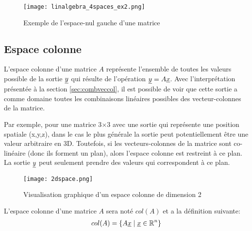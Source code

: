 \begin{example}
\begin{figure}[H]
	\centering
		\texttt{[image: linalgebra\_4spaces\_ex2.png]}
	\caption{Exemple de l'espace-nul gauche d'une matrice}
	\label{fig:4spaces_ex2}
\end{figure}
\end{example}

\subsection{Espace colonne}
\label{sec:espcol}

L'espace colonne d'une matrice $A$ représente l'ensemble de toutes les valeurs possible de la sortie $\underline{y}$ qui résulte de l'opération $\underline{y} = A \underline{x}$. Avec l'interprétation présentée à la section \ref{sec:combveccol}, il est possible de voir que cette sortie a comme domaine toutes les combinaisons linéaires possibles des vecteur-colonnes de la matrice. 

Par exemple, pour une matrice 3$\times$3 avec une sortie qui représente une position spatiale (x,y,z), dans le cas le plus générale la sortie peut potentiellement être une valeur arbitraire en 3D. Toutefois, si les vecteurs-colonnes de la matrice sont co-linéaire (donc  ils forment un plan), alors l'espace colonne est restreint à ce plan. La sortie $\underline{y}$ peut seulement prendre des valeurs qui correspondent à ce plan. 

\begin{figure}[H]
	\centering
		\texttt{[image: 2dspace.png]}
	\caption{Visualisation graphique d'un espace colonne de dimension 2}
	\label{fig:2dspace}
\end{figure}


L'espace colonne d'une matrice $A$ sera noté $col(A)$ et a la définition suivante:
\begin{align}
col(A) = 
\{ A \underline{x} \; | \; \underline{x} \in \operatorname{\mathbb{R}}^n \}
\label{eq:cola}
\end{align}

